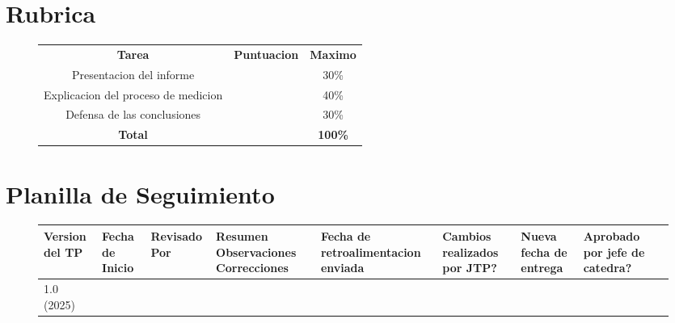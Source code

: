 \documentclass[a4paper,12pt, spanish]{report}
\begin{document}
      \section{Rubrica}
      \begin{figure}[!h]
        \centering
        \begin{tabular}[c]{|c|c|c|}
          \rowcolor{gray!30}
          \hline
          \textbf{Tarea}                      & \textbf{Puntuacion} & \textbf{Maximo}\\
          Presentacion del informe            &                     & 30\%\\
          \hline
          Explicacion del proceso de medicion &                     & 40\%\\
          \hline
          Defensa de las conclusiones         &                     & 30\%\\
          \hline
          \textbf{Total}                      &                     & \textbf{100\%}\\
          \hline
        \end{tabular}
      \end{figure}

      \section{Planilla de Seguimiento}
      \begin{figure}[!h]
        \begin{footnotesize}
          \begin{tabular}{|m{1cm}|m{1cm}|m{1.3cm}|m{2cm}|m{1.7cm}|m{1.7cm}|m{1.7cm}|m{1.7cm}|m{1.7cm}|}
            \hline
            Version del TP & Fecha de Inicio & Revisado Por & Resumen Observaciones Correcciones &
            Fecha de retroalimentacion enviada & Cambios realizados por JTP? & Nueva fecha de entrega &
            Aprobado por jefe de catedra?\\
            \hline
            1.0 (2025) & & & & & & &\\
            \hline
          \end{tabular}
        \end{footnotesize}
      \end{figure}
\end{document}
